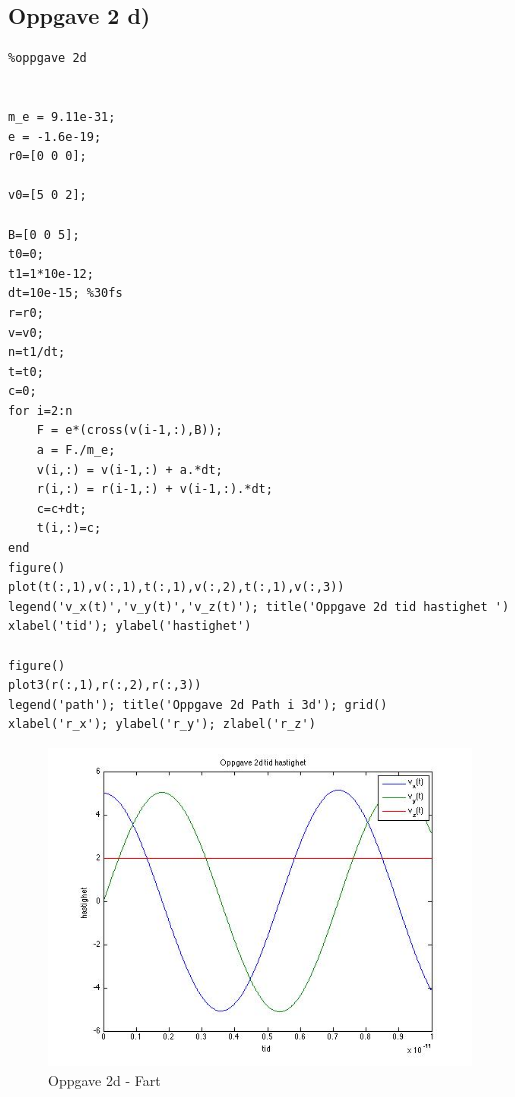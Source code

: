 \documentclass[12pt,a4paper,final,leqno]{report}
\begin{document}
\subsection*{Oppgave 2 d)}
\begin{verbatim}
%oppgave 2d


m_e = 9.11e-31; 
e = -1.6e-19; 
r0=[0 0 0];

v0=[5 0 2];

B=[0 0 5];
t0=0;
t1=1*10e-12;
dt=10e-15; %30fs
r=r0;
v=v0;
n=t1/dt;
t=t0;
c=0;
for i=2:n
    F = e*(cross(v(i-1,:),B));
    a = F./m_e; 
    v(i,:) = v(i-1,:) + a.*dt;
    r(i,:) = r(i-1,:) + v(i-1,:).*dt; 
    c=c+dt;
    t(i,:)=c;
end
figure() 
plot(t(:,1),v(:,1),t(:,1),v(:,2),t(:,1),v(:,3)) 
legend('v_x(t)','v_y(t)','v_z(t)'); title('Oppgave 2d tid hastighet ') 
xlabel('tid'); ylabel('hastighet') 

figure() 
plot3(r(:,1),r(:,2),r(:,3)) 
legend('path'); title('Oppgave 2d Path i 3d'); grid() 
xlabel('r_x'); ylabel('r_y'); zlabel('r_z')
\end{verbatim}

\begin{figure}[H]
\caption{Oppgave 2d - Fart}
\centering
\includegraphics[width=\textwidth]{oppgave2dvt.jpg}
\end{figure}
\end{document}
